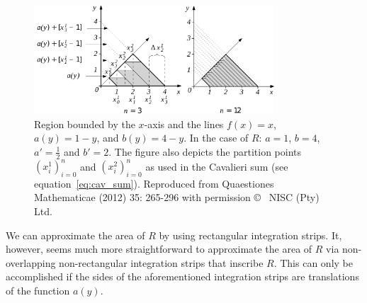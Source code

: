 \documentclass[twoside,reqno,11pt]{fcaa-var} %
\begin{document}
\begin{figure}[htb]
\centering
\includegraphics[width=0.8\textwidth]{fig13.pdf}
\caption{Region bounded by the $x$-axis and the lines $f(x)=x$, $a(y)=1-y$, and $b(y)=4-y$. In the case of $R$: $a=1$, $b=4$, $a'=\frac{1}{2}$ and $b'=2$. The figure also depicts the partition points $(x_i^1)_{i=0}^{n}$ and $(x_i^2)_{i=0}^{n}$ as used in the Cavalieri sum (see equation~\eqref{eq:cav_sum}). Reproduced from Quaestiones Mathematicae (2012) 35: 265-296 with permission \copyright~ NISC (Pty) Ltd.}
\label{fig:caval2}
\end{figure}


\noindent
We can approximate the area of $R$ by using rectangular integration strips. It, however, seems much more straightforward to approximate the area of $R$ via non-overlapping non-rectangular integration strips that inscribe $R$. This can only be accomplished if the sides of the aforementioned integration strips are translations of the function $a(y)$.\\
\end{document}
